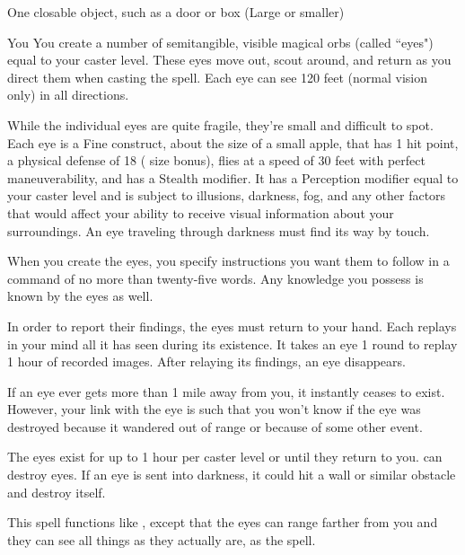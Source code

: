 \begin{spelltarget}{One closable object, such as a door or box (Large or smaller)}
\begin{spelltarget}{You}
\spelleffect You create a number of semitangible, visible magical orbs (called ``eyes") equal to your caster level. These eyes move out, scout around, and return as you direct them when casting the spell. Each eye can see 120 feet (normal vision only) in all directions.
\par While the individual eyes are quite fragile, they're small and difficult to spot. Each eye is a Fine construct, about the size of a small apple, that has 1 hit point, a physical defense of 18 ( size bonus), flies at a speed of 30 feet with perfect maneuverability, and has a  Stealth modifier. It has a Perception modifier equal to your caster level and is subject to illusions, darkness, fog, and any other factors that would affect your ability to receive visual information about your surroundings. An eye traveling through darkness must find its way by touch.
\par When you create the eyes, you specify instructions you want them to follow in a command of no more than twenty-five words. Any knowledge you possess is known by the eyes as well.
\par In order to report their findings, the eyes must return to your hand. Each replays in your mind all it has seen during its existence. It takes an eye 1 round to replay 1 hour of recorded images. After relaying its findings, an eye disappears.
\par If an eye ever gets more than 1 mile away from you, it instantly ceases to exist. However, your link with the eye is such that you won't know if the eye was destroyed because it wandered out of range or because of some other event.
\par The eyes exist for up to 1 hour per caster level or until they return to you.
\spellnotes {} can destroy eyes. If an eye is sent into darkness, it could hit a wall or similar obstacle and destroy itself.

\spelleffect This spell functions like , except that the eyes can range farther from you and they can see all things as they actually are, as the  spell.


\end{spelltarget}
\end{spelltarget}
